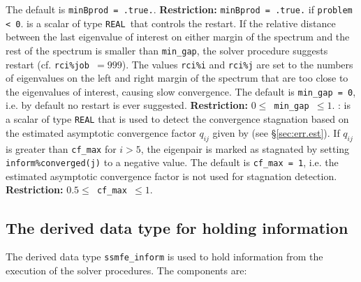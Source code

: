 \begin{description}
The default is {\tt minBprod = .true.}.
{\bf Restriction:} {\tt minBprod = .true.} if {\tt problem < 0}.
%
is a scalar of type {\tt REAL}\ that
controls the restart.
If the relative distance between the last eigenvalue of interest
on either margin of the spectrum and the rest of the spectrum
is smaller than {\tt min\_gap},
the solver procedure suggests restart
(cf. {\tt rci\%job $= 999$}).
The values 
{\tt rci\%i}
and
{\tt rci\%j}
are set to the numbers of eigenvalues on the left and right
margin of the spectrum that are too close to the eigenvalues
of interest, causing slow convergence.
The default is {\tt min\_gap = 0}, i.e.
by default no restart is ever suggested.
{\bf Restriction:} {\tt $0 \le$ min\_gap $\le 1$}.
%
:
is a scalar of type {\tt REAL} that
is used to detect the convergence stagnation
based on 
the estimated asymptotic convergence factor 
$q_{ij}$ given by 
(see \S\ref{sec:err.est}).
If $q_{ij}$ is greater than {\tt cf\_max} for $i > 5$,
the eigenpair is marked as stagnated by setting
{\tt inform\%converged(j)} to a negative value.
The default is {\tt cf\_max = 1}, i.e.
the estimated asymptotic convergence factor
is not used for stagnation detection.
{\bf Restriction:} {\tt $0.5 \le$ cf\_max $\le 1$}.
%
\end{description}

\subsection{The derived data type for holding information}

\label{sec:inform}

The derived data type {\tt ssmfe\_inform} is used
to hold information from the execution of
the solver procedures.
The components are:

